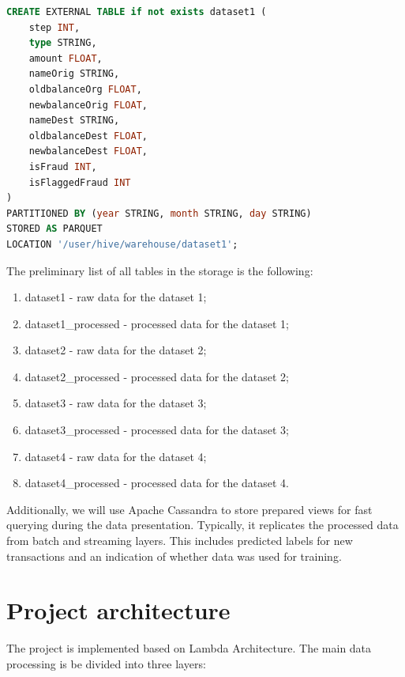 \documentclass[12pt,a4paper, hidelinks]{article}
\begin{document}
\begin{lstlisting}[language=SQL, caption=Apache Hive table creation]
CREATE EXTERNAL TABLE if not exists dataset1 (
    step INT,
    type STRING,
    amount FLOAT,
    nameOrig STRING,
    oldbalanceOrg FLOAT,
    newbalanceOrig FLOAT,
    nameDest STRING,
    oldbalanceDest FLOAT,
    newbalanceDest FLOAT,
    isFraud INT,
    isFlaggedFraud INT
)
PARTITIONED BY (year STRING, month STRING, day STRING)
STORED AS PARQUET
LOCATION '/user/hive/warehouse/dataset1';
\end{lstlisting}

The preliminary list of all tables in the storage is the following:

\begin{enumerate}
    \item dataset1 - raw data for the dataset 1;
    \item dataset1\_processed - processed data for the dataset 1;
    \item dataset2 - raw data for the dataset 2;
    \item dataset2\_processed - processed data for the dataset 2;
    \item dataset3 - raw data for the dataset 3;
    \item dataset3\_processed - processed data for the dataset 3;
    \item dataset4 - raw data for the dataset 4;
    \item dataset4\_processed - processed data for the dataset 4.
\end{enumerate}

Additionally, we will use Apache Cassandra to store prepared views for fast querying during the data presentation. Typically, it replicates the processed data from batch and streaming layers. This includes predicted labels for new transactions and an indication of whether data was used for training.


\section{Project architecture}

The project is implemented based on Lambda Architecture. The main data processing is be divided into three layers:
\end{document}
